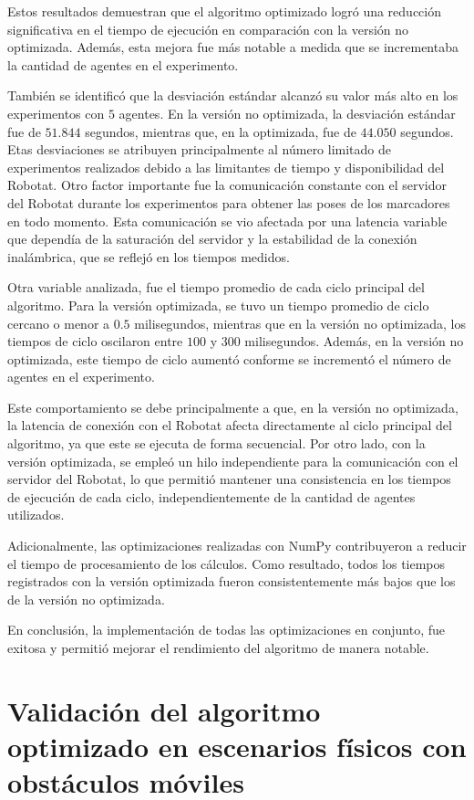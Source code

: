 Estos resultados demuestran que el algoritmo optimizado logró una reducción significativa en el tiempo de ejecución en comparación con la versión no optimizada. Además, esta mejora fue más notable a medida que se incrementaba la cantidad de agentes en el experimento.

También se identificó que la desviación estándar alcanzó su valor más alto en los experimentos con $5$ agentes. En la versión no optimizada, la desviación estándar fue de $51.844$ segundos, mientras que, en la optimizada, fue de $44.050$ segundos. Etas desviaciones se atribuyen principalmente al número limitado de experimentos realizados debido a las limitantes de tiempo y disponibilidad del Robotat. Otro factor importante fue la comunicación constante con el servidor del Robotat durante los experimentos para obtener las poses de los marcadores en todo momento. Esta comunicación se vio afectada por una latencia variable que dependía de la saturación del servidor y la estabilidad de la conexión inalámbrica, que se reflejó en los tiempos medidos.

Otra variable analizada, fue el tiempo promedio de cada ciclo principal del algoritmo. Para la versión optimizada, se tuvo un tiempo promedio de ciclo cercano o menor a $0.5$ milisegundos, mientras que en la versión no optimizada, los tiempos de ciclo oscilaron entre $100$ y $300$ milisegundos. Además, en la versión no optimizada, este tiempo de ciclo aumentó conforme se incrementó el número de agentes en el experimento.

Este comportamiento se debe principalmente a que, en la versión no optimizada, la latencia de conexión con el Robotat afecta directamente al ciclo principal del algoritmo, ya que este se ejecuta de forma secuencial. Por otro lado, con la versión optimizada, se empleó un hilo independiente para la comunicación con el servidor del Robotat, lo que permitió mantener una consistencia en los tiempos de ejecución de cada ciclo, independientemente de la cantidad de agentes utilizados. 

Adicionalmente, las optimizaciones realizadas con NumPy contribuyeron a reducir el tiempo de procesamiento de los cálculos. Como resultado, todos los tiempos registrados con la versión optimizada fueron consistentemente más bajos que los de la versión no optimizada.

En conclusión, la implementación de todas las optimizaciones en conjunto, fue exitosa y permitió mejorar el rendimiento del algoritmo de manera notable.

\chapter{Validación del algoritmo optimizado en escenarios físicos con obstáculos móviles}\label{cap:validacion}






